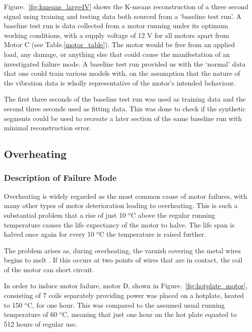 Figure.~\ref{fig:kmeans_large4V} shows the K-means reconstruction of a three second signal using training and testing data both sourced from a `baseline test run'. A baseline test run is data collected from a motor running under its optimum working conditions, with a supply voltage of 12 V for all motors apart from Motor C (see Table.\ref{motor_table}). The motor would be free from an applied load, any damage, or anything else that could cause the manifestation of an investigated failure mode. A baseline test run provided us with the `normal' data that one could train various models with, on the assumption that the nature of the vibration data is wholly representative of the motor's intended behaviour.

The first three seconds of the baseline test run was used as training data and the second three seconds used as fitting data. This was done to check if the synthetic segments could be used to recreate a later section of the same baseline run with minimal reconstruction error. 

\subsection{Overheating}

\subsubsection{Description of Failure Mode}

Overheating is widely regarded as the most common cause of motor failures, with many other types of motor deterioration leading to overheating. This is such a substantial problem that a rise of just 10 $^o$C above the regular running temperature causes the life expectancy of the motor to halve. The life span is halved once again for every 10 $^o$C the temperature is raised further.%

The problem arises as, during overheating, the varnish covering the metal wires begins to melt \cite{wagner1993effects}. If this occurs at two points of wires that are in contact, the coil of the motor can short circuit.


In order to induce motor failure, motor D, shown in Figure.~\ref{fig:hotplate_motor}, consisting of 7 coils separately providing power was placed on a hotplate, heated to 150 $^o$C, for one hour. This was compared to the assumed usual running temperature of 60 $^o$C, meaning that just one hour on the hot plate equated to 512 hours of regular use.

